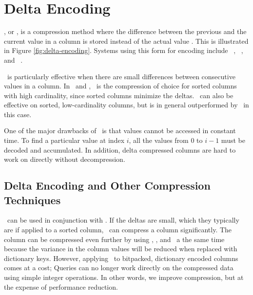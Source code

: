 \section{Delta Encoding}
\label{sec:Delta Encoding}


\dele, or , is a compression method where the difference between the previous and the current value in a column is stored instead of the actual value \cite{Wikipedia_contributors2015-cb}. This is illustrated in Figure \ref{fig:delta-encoding}.  Systems using this form for encoding include \vertica~\cite{Lamb2012-kg}, \cstore~\cite{Stonebraker2005-qz}, and \blink~\cite{Raman2008-gi}. 

\dele~is particularly effective when there are small differences between consecutive values in a column. In \cstore~and \vertica, \dele~is the compression of choice for sorted columns with high cardinality, since sorted columns minimize the deltas. \dele~can also be effective on sorted, low-cardinality columns, but is in general outperformed by \rle~in this case.

One of the major drawbacks of \dele~is that values cannot be accessed in constant time. To find a particular value at index $i$, all the values from $0$ to $i - 1$ must be decoded and accumulated. In addition, delta compressed columns are hard to work on directly without decompression.

\subsection{Delta Encoding and Other Compression Techniques}
\label{sub:Delta Encoding and Other Compression Techniques}
\bp~can be used in conjunction with \dele. If the deltas are small, which they typically are if applied to a sorted column, \bp~can compress a column significantly. The column can be compressed even further by using \de, \dele, and \bp~a the same time because the variance in the column values will be reduced when replaced with dictionary keys. However, applying \dele~to bitpacked, dictionary encoded columns comes at a cost; Queries can no longer work directly on the compressed data using simple integer operations. In other words, we improve compression, but at the expense of performance reduction.

